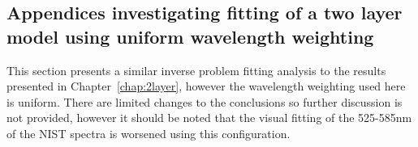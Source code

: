% 
% 

% 

% 
\clearpage
\begin{subappendices}
    \section{Appendices investigating fitting of a two layer model using uniform wavelength weighting}\label{ap:2layeruniform}
This section presents a similar inverse problem fitting analysis to the results presented in Chapter~\ref{chap:2layer}, however the wavelength weighting used here is uniform. There are limited changes to the conclusions so further discussion is not provided, however it should be noted that the visual fitting of the 525-585nm of the NIST spectra is worsened using this configuration.


\end{subappendices}
